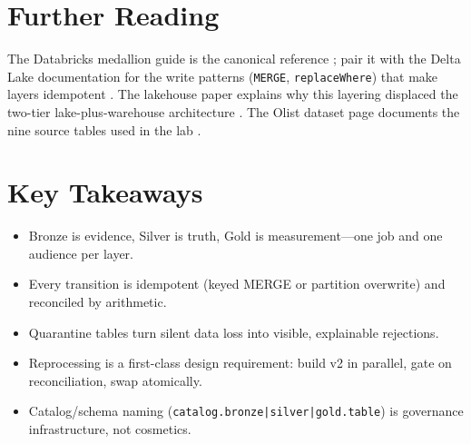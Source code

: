 \section{Further Reading}
The Databricks medallion guide is the canonical reference \cite{databricksMedallion}; pair it with the Delta Lake documentation for the write patterns (\texttt{MERGE}, \texttt{replaceWhere}) that make layers idempotent \cite{deltaLakeDocs,databricksDelta}. The lakehouse paper explains why this layering displaced the two-tier lake-plus-warehouse architecture \cite{armbrust2021lakehouse}. The Olist dataset page documents the nine source tables used in the lab \cite{olistDataset}.

\section*{Key Takeaways}
\begin{itemize}
    \item Bronze is evidence, Silver is truth, Gold is measurement---one job and one audience per layer.
    \item Every transition is idempotent (keyed MERGE or partition overwrite) and reconciled by arithmetic.
    \item Quarantine tables turn silent data loss into visible, explainable rejections.
    \item Reprocessing is a first-class design requirement: build v2 in parallel, gate on reconciliation, swap atomically.
    \item Catalog/schema naming (\texttt{catalog.bronze|silver|gold.table}) is governance infrastructure, not cosmetics.
\end{itemize}


